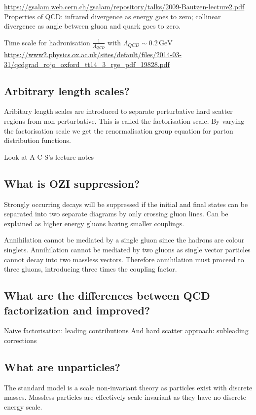 \documentclass[12pt]{article}
\begin{document}
\url{https://gsalam.web.cern.ch/gsalam/repository/talks/2009-Bautzen-lecture2.pdf}
Properties of QCD: infrared divergence as energy goes to zero; collinear divergence as angle between gluon and quark goes to zero.

Time scale for hadronisation $\frac{1}{\Lambda_{QCD}}$ with $\Lambda_{QCD}\sim 0.2\,\text{GeV}$
\url{https://www2.physics.ox.ac.uk/sites/default/files/2014-03-31/qcdgrad_rojo_oxford_tt14_3_rge_pdf_19828.pdf}


\subsection{Arbitrary length scales?}
Aribitary length scales are introduced to separate perturbative hard scatter regions from non-perturbative. This is called the factorisation scale. By varying the factorisation scale we get the renormalisation group equation for parton distribution functions.

        Look at A C-S's lecture notes
\subsection{What is OZI suppression?}
Strongly occurring decays will be suppressed if the initial and final states can be separated into two separate diagrams by only crossing gluon lines. Can be explained as higher energy gluons having smaller couplings.

Annihilation cannot be mediated by a single gluon since the hadrons are colour singlets. Annihilation cannot be mediated by two gluons as single vector particles cannot decay into two massless vectors. Therefore annihilation must proceed to three gluons, introducing three times the coupling factor.

\subsection{What are the differences between QCD factorization and improved?}

Naive factorisation: leading contributions
And hard scatter approach: subleading corrections
\subsection{What are unparticles?}
The standard model is a scale non-invariant theory as particles exist with discrete masses. Massless particles are effectively scale-invariant as they have no discrete energy scale.
\end{document}
